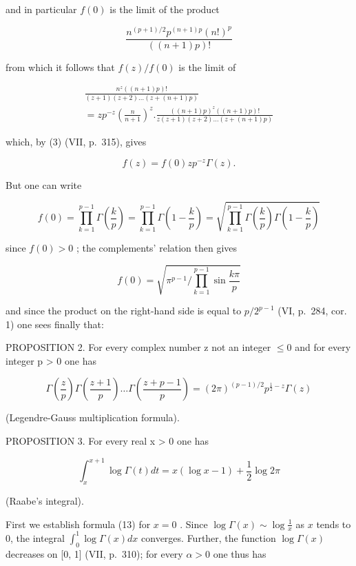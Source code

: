and in particular \(f(0)\) is the limit of the product

\[
\frac {n ^ {(p + 1) / 2} p ^ {(n + 1) p} (n !) ^ {p}}{((n + 1) p) !}
\]

from which it follows that \(f(z) / f(0)\) is the limit of

\[
\begin{array}{c} \frac {n ^ {z} ((n + 1) p) !}{(z + 1) (z + 2) \dots (z + (n + 1) p)} \\ = z   p ^ {- z} \left(\frac {n}{n + 1}\right) ^ {z}. \frac {((n + 1) p) ^ {z} ((n + 1) p) !}{z (z + 1) (z + 2) \dots (z + (n + 1) p)} \end{array}
\]

which, by (3) (VII, p.~315), gives

\[
f (z) = f (0) z p ^ {- z} \Gamma (z).\tag{11}
\]

But one can write

\[
f (0) = \prod_ {k = 1} ^ {p - 1} \Gamma \left(\frac {k}{p}\right) = \prod_ {k = 1} ^ {p - 1} \Gamma \left(1 - \frac {k}{p}\right) = \sqrt {\prod_ {k = 1} ^ {p - 1} \Gamma \left(\frac {k}{p}\right) \Gamma \left(1 - \frac {k}{p}\right)}
\]

since \(f(0) > 0\) ; the complements' relation then gives

\[
f (0) = \sqrt {\pi^ {p - 1} / \prod_ {k = 1} ^ {p - 1} \sin \frac {k \pi}{p}}
\]

and since the product on the right-hand side is equal to \(p/2^{p-1}\) (VI, p.~284, cor. 1) one sees finally that:

PROPOSITION 2. For every complex number z not an integer \(\leqslant 0\) and for every integer p \textgreater{} 0 one has

\[
\Gamma \left(\frac {z}{p}\right) \Gamma \left(\frac {z + 1}{p}\right) \dots \Gamma \left(\frac {z + p - 1}{p}\right) = (2 \pi) ^ {(p - 1) / 2} p ^ {\frac {1}{2} - z} \Gamma (z)\tag{12}
\]

(Legendre-Gauss multiplication formula).

PROPOSITION 3. For every real x \textgreater{} 0 one has

\[
\int_ {x} ^ {x + 1} \log \Gamma (t) d t = x (\log x - 1) + \frac {1}{2} \log 2 \pi\tag{13}
\]

(Raabe's integral).

First we establish formula (13) for \(x = 0\) . Since \(\log \Gamma(x) \sim \log \frac{1}{x}\) as \(x\) tends to 0, the integral \(\int_0^1 \log \Gamma(x) dx\) converges. Further, the function \(\log \Gamma(x)\) decreases on {[}0, 1{]} (VII, p.~310); for every \(\alpha > 0\) one thus has

